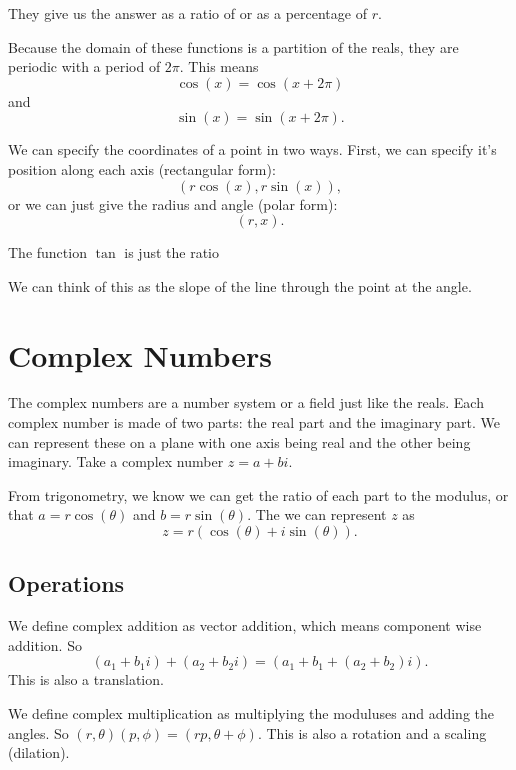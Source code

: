 \documentclass[../main.tex]{subfiles}
\begin{document}
They give us the answer as a ratio of or as a percentage of \( r \).

Because the domain of these functions is a partition of the reals,
they are periodic with a period of \( 2\pi \).
This means
\[ \cos(x) = \cos(x + 2\pi) \]
and
\[ \sin(x) = \sin(x + 2\pi). \]

We can specify the coordinates of a point in two ways.
First, we can specify it's position along each axis (rectangular form):
\[ (r \cos(x), r \sin(x)), \]
or we can just give the radius and angle (polar form):
\[ (r, x). \]

\newpage
The function \( \tan \) is just the ratio




We can think of this as the slope of the line through the point at the angle.


\newpage
\section{Complex Numbers}

The complex numbers are a number system or a field just like the reals.
Each complex number is made of two parts: the real part and the imaginary part.
We can represent these on a plane with one axis being real and the other being imaginary.
Take a complex number \( z = a + bi \).
    



From trigonometry, we know we can get the ratio of each part to the modulus,
or that \( a = r \cos(\theta) \)
and \( b = r \sin(\theta) \).
The we can represent \( z \) as
\[ z = r(\cos(\theta) + i \sin(\theta)). \]

\subsection{Operations}

We define complex addition as vector addition,
which means component wise addition.
So \[ (a_1 + b_1 i) + (a_2 + b_2 i) = (a_1 + b_1 + (a_2 + b_2)i). \]
This is also a translation.



We define complex multiplication as multiplying the moduluses and adding the angles.
So \( (r, \theta)(p, \phi) = (rp, \theta + \phi) \).
This is also a rotation and a scaling (dilation).
\end{document}
